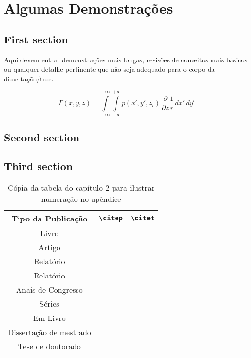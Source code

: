 \chapter{Algumas Demonstrações}

\section{First section}

Aqui devem entrar demonstrações mais longas, revisões de conceitos mais básicos
ou qualquer detalhe pertinente que não seja adequado para o corpo da
dissertação/tese.

\begin{equation}
\Gamma(x, y, z) = \int\limits_{-\infty}^{+\infty}\int\limits_{-\infty}^{+\infty}
p(x', y', z_{c}) \, \frac{\partial}{\partial z} \frac{1}{r} \: dx' \, dy'
\label{eq:apendice1}
\end{equation}

\section{Second section}

\lipsum[3-5]

\section{Third section}

\begin{table}[h]
	\caption[Cópia da tabela do capítulo 2]
	{Cópia da tabela do capítulo 2 para ilustrar numeração no apêndice}
	\label{tab:citation-copy}
	\centering
	{\footnotesize
		\begin{tabular}{|c|c|c|}
			\hline
			Tipo da Publica{\c c}\~ao & \verb|\citep| & \verb|\citet|\\
			\hline
			Livro & \citep{book-example} & \citet{book-example}\\
			Artigo & \citep{article-example} & \citet{article-example}\\
			Relat\'orio & \citep{techreport-example} & \citet{techreport-example}\\
			Relat\'orio & \citep{techreport-exampleIn} & \citet{techreport-exampleIn}\\
			Anais de Congresso & \citep{inproceedings-example} &
			\citet{inproceedings-example}\\
			S\'eries & \citep{incollection-example} & \citet{incollection-example}\\
			Em Livro & \citep{inbook-example} & \citet{inbook-example}\\
			Disserta{\c c}\~ao de mestrado & \citep{mastersthesis-example} &
			\citet{mastersthesis-example}\\
			Tese de doutorado & \citep{phdthesis-example} & \citet{phdthesis-example}\\
			\hline
	\end{tabular}}
\end{table}